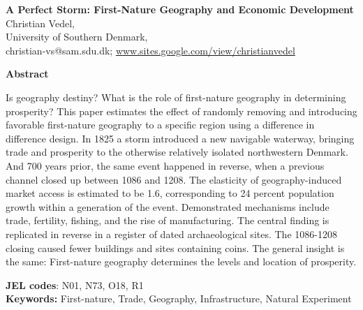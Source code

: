 \documentclass[11pt]{article}
\begin{document}
\begin{titlepage}

    \begin{center}
        \LARGE
        \textbf{A Perfect Storm: First-Nature Geography and Economic Development} \\
        
        \vspace{0.5cm}
        \Large
        Christian Vedel, \\ University of Southern Denmark,\\
        \small
        \vspace{0.25cm}
        christian-vs@sam.sdu.dk; 
        \url{www.sites.google.com/view/christianvedel} 
        
        \vspace{1.5cm}
    
        \large
        \textbf{Abstract} \\     
    \end{center}

   
    \normalsize
    Is geography destiny? What is the role of first-nature geography in determining prosperity? This paper estimates the effect of randomly removing and introducing favorable first-nature geography to a specific region using a difference in difference design. In 1825 a storm introduced a new navigable waterway, bringing trade and prosperity to the otherwise relatively isolated northwestern Denmark. And 700 years prior, the same event happened in reverse, when a previous channel closed up between 1086 and 1208. The elasticity of geography-induced market access is estimated to be 1.6, corresponding to 24 percent population growth within a generation of the event. Demonstrated mechanisms include trade, fertility, fishing, and the rise of manufacturing. The central finding is replicated in reverse in a register of dated archaeological sites. The 1086-1208 closing caused fewer buildings and sites containing coins. The general insight is the same: First-nature geography determines the levels and location of prosperity.
    
    \vspace{0.05cm} 
    \textbf{JEL codes}: N01, N73, O18, R1 \\
    \textbf{Keywords:} First-nature, Trade, Geography, Infrastructure, Natural Experiment

    
    
    \vfill
    

\end{titlepage}
\end{document}
